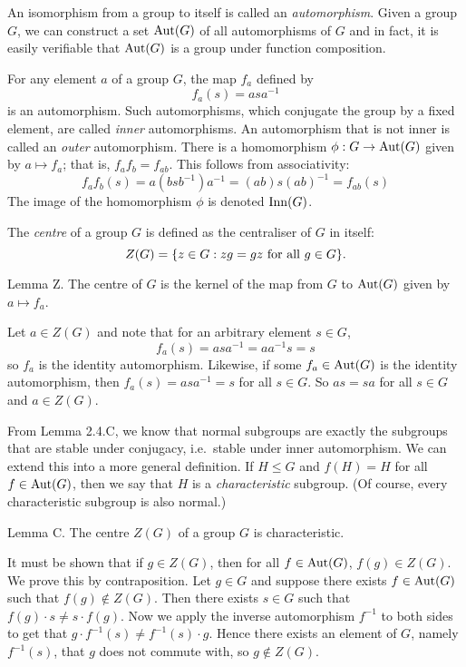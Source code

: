 An isomorphism from a group to itself is called an {\it automorphism}. Given a group $G$, we can construct a set $\mathop{\rm Aut}\nolimits(G)$ of all automorphisms of $G$ and in fact, it is easily verifiable that $\mathop{\rm Aut}\nolimits(G)$ is a group under function composition.

For any element $a$ of a group $G$, the map $f_a$ defined by
$$f_a(s) = asa^{-1}$$
is an automorphism. Such automorphisms, which conjugate the group by a fixed element, are called {\it inner} automorphisms. An automorphism that is not inner is called an {\it outer} automorphism. There is a homomorphism $\phi:G\rightarrow \mathop{\rm Aut}\nolimits(G)$ given by $a\mapsto f_a$; that is, $f_af_b = f_{ab}$. This follows from associativity:
$$f_af_b(s) = a(bsb^{-1})a^{-1} = (ab)s(ab)^{-1} = f_{ab}(s)$$
The image of the homomorphism $\phi$ is denoted $\mathop{\rm Inn}\nolimits(G)$.

The {\it centre} of a group $G$ is defined as the centraliser of $G$ in itself:
$$Z(G) = \{z\in G : zg = gz\ \hbox{for all}\ g\in G\}.$$

\proclaim Lemma Z. The centre of $G$ is the kernel of the map from $G$ to $\mathop{\rm Aut}\nolimits(G)$ given by $a\mapsto f_a$.

\proof Let $a\in Z(G)$ and note that for an arbitrary element $s\in G$,
$$f_a(s) = asa^{-1} = aa^{-1}s = s$$
so $f_a$ is the identity automorphism. Likewise, if some $f_a\in \mathop{\rm Aut}\nolimits(G)$ is the identity automorphism, then $f_a(s) = asa^{-1} = s$ for all $s\in G$. So $as = sa$ for all $s\in G$ and $a\in Z(G)$.\slug

From Lemma 2.4.C, we know that normal subgroups are exactly the subgroups that are stable under conjugacy, i.e.\ stable under inner automorphism. We can extend this into a more general definition. If $H\leq G$ and $f(H) = H$ for all $f\in \mathop{\rm Aut}\nolimits(G)$, then we say that $H$ is a {\it characteristic} subgroup. (Of course, every characteristic subgroup is also normal.)

\proclaim Lemma C. The centre $Z(G)$ of a group $G$ is characteristic.

\proof It must be shown that if $g\in Z(G)$, then for all $f\in\mathop{\rm Aut}\nolimits(G)$, $f(g)\in Z(G)$. We prove this by contraposition. Let $g\in G$ and suppose there exists $f\in\mathop{\rm Aut}\nolimits(G)$ such that $f(g)\notin Z(G)$. Then there exists $s\in G$ such that $f(g)\cdot s \neq s\cdot f(g)$. Now we apply the inverse automorphism $f^{-1}$ to both sides to get that $g\cdot f^{-1}(s) \neq f^{-1}(s)\cdot g$. Hence there exists an element of $G$, namely $f^{-1}(s)$, that $g$ does not commute with, so $g\notin Z(G)$.\slug

